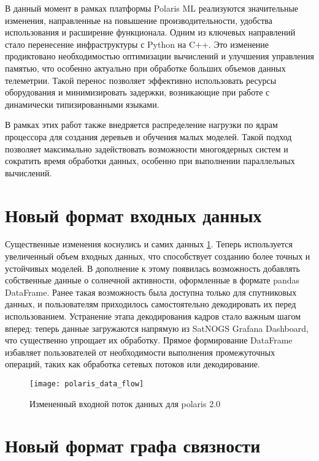 \documentclass[14pt, a4paper]{src/bsu}
\begin{document}
В данный момент в рамках платформы Polaris ML реализуются значительные
изменения, направленные на повышение производительности, удобства использования
и расширение функционала. Одним из ключевых направлений стало перенесение
инфраструктуры с Python на C++. Это изменение продиктовано необходимостью
оптимизации вычислений и улучшения управления памятью, что особенно актуально
при обработке больших объемов данных телеметрии. Такой перенос позволяет
эффективно использовать ресурсы оборудования и минимизировать задержки,
возникающие при работе с динамически типизированными языками.

В рамках этих работ также внедряется распределение нагрузки по ядрам процессора
для создания деревьев и обучения малых моделей. Такой подход позволяет
максимально задействовать возможности многоядерных систем и сократить время
обработки данных, особенно при выполнении параллельных вычислений.

\section{Новый формат входных данных}

Существенные изменения коснулись и самих данных \ref{fig:polaris_data_flow}.
Теперь используется увеличенный объем входных данных, что способствует созданию
более точных и устойчивых моделей. В дополнение к этому появилась возможность
добавлять собственные данные о солнечной активности, оформленные в формате
pandas DataFrame. Ранее такая возможность была доступна только для спутниковых
данных, и пользователям приходилось самостоятельно декодировать их перед
использованием. Устранение этапа декодирования кадров стало важным шагом
вперед: теперь данные загружаются напрямую из SatNOGS Grafana Dashboard, что
существенно упрощает их обработку. Прямое формирование DataFrame избавляет
пользователей от необходимости выполнения промежуточных операций, таких как
обработка сетевых потоков или декодирование.

\begin{figure}[htbp] \centering
	\texttt{[image: polaris\_data\_flow]} \caption{Измененный
		входной поток данных для polaris 2.0} \label{fig:polaris_data_flow}
\end{figure}

\section{Новый формат графа связности}
\end{document}
